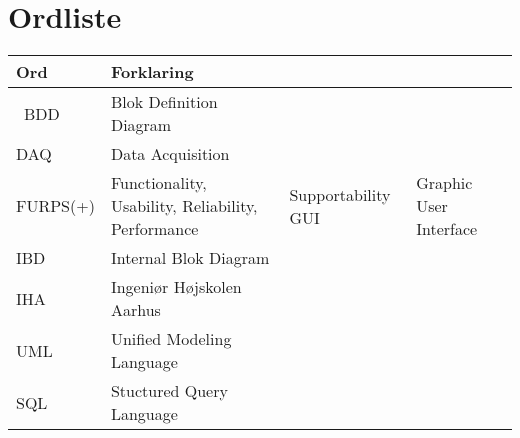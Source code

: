\chapter{Ordliste}


\begin{longtabu} to 
    Ord &    Forklaring\\
    \toprule \
    BDD & Blok Definition Diagram \\	    
    DAQ & Data Acquisition\\
    FURPS(+) & Functionality, Usability, Reliability, Performance & Supportability
	GUI & Graphic User Interface\\
	IBD & Internal Blok Diagram\\
	IHA & Ingeniør Højskolen Aarhus\\
	UML & Unified Modeling Language\\
	SQL & Stuctured Query Language\\
\end{longtabu}